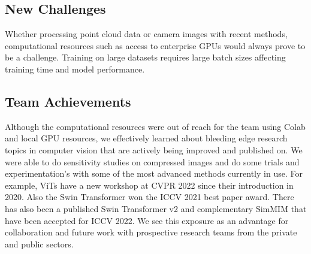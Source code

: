 \documentclass[10pt,twocolumn,letterpaper]{article}
\begin{document}
\subsection{New Challenges}

Whether processing point cloud data or camera images with recent methods, computational resources such as access to enterprise GPUs would always prove to be a challenge. Training on large datasets requires large batch sizes affecting training time and model performance.

\subsection{Team Achievements}

Although the computational resources were out of reach for the team using Colab and local GPU resources, we effectively learned about bleeding edge research topics in computer vision that are actively being improved and published on. We were able to do sensitivity studies on compressed images and do some trials and experimentation's with some of the most advanced methods currently in use. For example, ViTs have a new workshop at CVPR 2022 since their introduction in 2020. Also the Swin Transformer won the ICCV 2021 best paper award. There has also been a published Swin Transformer v2 and complementary SimMIM that have been accepted for ICCV 2022. We see this exposure as an advantage for collaboration and future work with prospective research teams from the private and public sectors.






\end{document}
